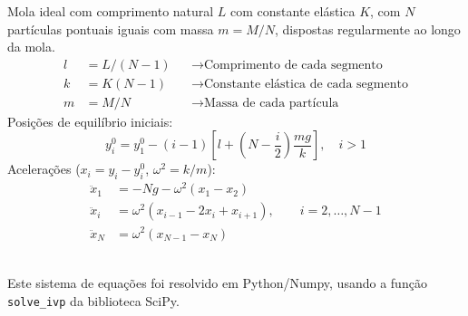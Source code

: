 \begin{minipage}{0.7\colwidth}
Mola ideal com comprimento natural $L$ com constante elástica $K$, com $N$
partículas pontuais iguais com massa $m=M/N$, dispostas regularmente ao longo da
mola.
\begin{align*}
  l&=L/(N-1)&&\rightarrow\text{Comprimento de cada segmento}\\
  k&=K(N-1)&& \rightarrow\text{Constante elástica de cada segmento}\\
  m&=M/N    &&\rightarrow\text{Massa de cada partícula}
\end{align*}
Posições de equilíbrio iniciais:
\begin{equation*}
  y_i^0=y_1^0-(i-1)\left[l+\left(N-\frac{i}{2}\right)\frac{mg}{k}\right],
  \quad i>1
\end{equation*}
Acelerações ($x_i=y_i-y_i^0$, $\omega^2=k/m$):
  \begin{align*}
    \ddot x_1 &=-Ng-\omega^2(x_1-x_2)\\
    \ddot x_i &= \omega^2(x_{i-1}-2x_i+x_{i+1}),\qquad i=2, \ldots, N-1\\
    \ddot x_{N} &=\omega^2(x_{N-1}-x_{N})
  \end{align*}
\end{minipage}\\[1cm]
Este sistema de equações foi resolvido em Python/Numpy, usando a função
\texttt{solve\_ivp} da biblioteca SciPy.
